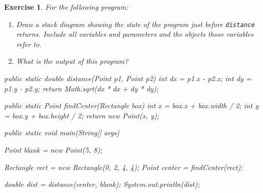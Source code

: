 \documentclass[12pt]{book}
\theoremstyle{exercise}
\newtheorem{exercise}{Exercise}[chapter]
\newcommand{\java}[1]{\verb"#1"}
\begin{document}
\begin{exercise}
For the following program:

\begin{enumerate}

\item Draw a stack diagram showing the state of the program just before \java{distance} returns.
Include all variables and parameters and the objects those variables refer to.

\item What is the output of this program?

\end{enumerate}

\begin{code}
    public static double distance(Point p1, Point p2) {
        int dx = p1.x - p2.x;
        int dy = p1.y - p2.y;
        return Math.sqrt(dx * dx + dy * dy);
    }

    public static Point findCenter(Rectangle box) {
        int x = box.x + box.width / 2;
        int y = box.y + box.height / 2;
        return new Point(x, y);
    }
\end{code}

\begin{code}
    public static void main(String[] args) {
        Point blank = new Point(5, 8);

        Rectangle rect = new Rectangle(0, 2, 4, 4);
        Point center = findCenter(rect);

        double dist = distance(center, blank);
        System.out.println(dist);
    }
\end{code}

\end{exercise}
\end{document}
